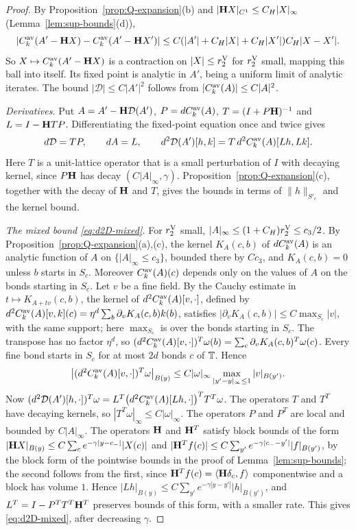 \begin{proof}
By Proposition~\ref{prop:Q-expansion}(b) and $|\mathbf H X|_{C^1}\le C_H|X|_\infty$ (Lemma~\ref{lem:sup-bounds}(d)),
\[
|C^{\rm av}_k(A'-\mathbf H X)-C^{\rm av}_k(A'-\mathbf H X')|\le C(|A'|+C_H|X|+C_H|X'|)C_H|X-X'|.
\]
So $X\mapsto C^{\rm av}_k(A'-\mathbf H X)$ is a contraction on $|X|\le r_2^{\rm V}$ for $r_2^{\rm V}$ small, mapping this ball into itself. Its fixed point is analytic in $A'$, being a uniform limit of analytic iterates. The bound $|\mathcal D|\le C|A'|^2$ follows from $|C^{\rm av}_k(A)|\le C|A|^2$.

\emph{Derivatives.} Put $A=A'-\mathbf H\mathcal D(A')$, $P=dC^{\rm av}_k(A)$, $T=(I+P\mathbf H)^{-1}$ and $L=I-\mathbf H TP$. Differentiating the fixed-point equation once and twice gives
\[
d\mathcal D=TP,\qquad dA=L,\qquad d^2\mathcal D(A')[h,k]=T\,d^2C^{\rm av}_k(A)[Lh,Lk].
\]
Here $T$ is a unit-lattice operator that is a small perturbation of $I$ with decaying kernel, since $P\mathbf H$ has decay $(C|A|_\infty,\gamma)$. Proposition~\ref{prop:Q-expansion}(c), together with the decay of $\mathbf H$ and $T$, gives the bounds in terms of $\|h\|_{S'_c}$ and the kernel bound.

\emph{The mixed bound \eqref{eq:d2D-mixed}.} For $r_2^{\rm V}$ small, $|A|_\infty\le(1+C_H)r_2^{\rm V}\le c_3/2$. By Proposition~\ref{prop:Q-expansion}(a),(c), the kernel $K_A(c,b)$ of $dC^{\rm av}_k(A)$ is an analytic function of $A$ on $\{|A|_\infty\le c_3\}$, bounded there by $Cc_3$, and $K_A(c,b)=0$ unless $b$ starts in $S_c$. Moreover $C^{\rm av}_k(A)(c)$ depends only on the values of $A$ on the bonds starting in $S_c$. Let $v$ be a fine field. By the Cauchy estimate in $t\mapsto K_{A+tv}(c,b)$, the kernel of $d^2C^{\rm av}_k(A)[v,\cdot]$, defined by $d^2C^{\rm av}_k(A)[v,k](c)=\eta^d\sum_b\partial_vK_A(c,b)k(b)$, satisfies $|\partial_vK_A(c,b)|\le C\max_{S_c}|v|$, with the same support; here $\max_{S_c}$ is over the bonds starting in $S_c$. The transpose has no factor $\eta^d$, so $(d^2C^{\rm av}_k(A)[v,\cdot])^T\omega(b)=\sum_c\partial_vK_A(c,b)^T\omega(c)$. Every fine bond starts in $S_c$ for at most $2d$ bonds $c$ of $\mathbb T$. Hence
\[
\big|(d^2C^{\rm av}_k(A)[v,\cdot])^T\omega\big|_{B(y)}\le C|\omega|_\infty\max_{|y'-y|_\infty\le1}|v|_{B(y')} .
\]
Now $(d^2\mathcal D(A')[h,\cdot])^T\omega=L^T\big(d^2C^{\rm av}_k(A)[Lh,\cdot]\big)^TT^T\omega$. The operators $T$ and $T^T$ have decaying kernels, so $|T^T\omega|_\infty\le C|\omega|_\infty$. The operators $P$ and $P^T$ are local and bounded by $C|A|_\infty$. The operators $\mathbf H$ and $\mathbf H^T$ satisfy block bounds of the form $|\mathbf H X|_{B(y)}\le C\sum_{c}e^{-\gamma|y-c_-|}|X(c)|$ and $|\mathbf H^Tf(c)|\le C\sum_{y'}e^{-\gamma|c_--y'|}|f|_{B(y')}$, by the block form of the pointwise bounds in the proof of Lemma~\ref{lem:sup-bounds}; the second follows from the first, since $\mathbf H^Tf(c)=\langle \mathbf H\delta_c,f\rangle$ componentwise and a block has volume $1$. Hence $|Lh|_{B(y)}\le C\sum_{y'}e^{-\gamma|y-y'|}|h|_{B(y')}$, and $L^T=I-P^TT^T\mathbf H^T$ preserves bounds of this form, with a smaller rate. This gives \eqref{eq:d2D-mixed}, after decreasing $\gamma$.


\end{proof}
